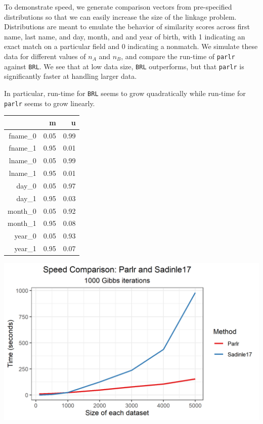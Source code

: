 \documentclass[
  12pt,
]{article}
\begin{document}
To demonstrate speed, we generate comparison vectors from pre-specified
distributions so that we can easily increase the size of the linkage
problem. Distributions are meant to emulate the behavior of similarity
scores across first name, last name, and day, month, and and year of
birth, with 1 indicating an exact match on a particular field and 0
indicating a nonmatch. We simulate these data for different values of
\(n_A\) and \(n_B\), and compare the run-time of \texttt{parlr} against
\texttt{BRL}. We see that at low data size, \texttt{BRL} outperforms,
but that \texttt{parlr} is significantly faster at handling larger data.

In particular, run-time for \texttt{BRL} seems to grow quadratically
while run-time for \texttt{parlr} seems to grow linearly.

\begin{table}[ht]
\centering
\begin{tabular}{rrr}
  \hline
 & m & u \\ 
  \hline
fname\_0 & 0.05 & 0.99 \\ 
  fname\_1 & 0.95 & 0.01 \\ 
  lname\_0 & 0.05 & 0.99 \\ 
  lname\_1 & 0.95 & 0.01 \\ 
  day\_0 & 0.05 & 0.97 \\ 
  day\_1 & 0.95 & 0.03 \\ 
  month\_0 & 0.05 & 0.92 \\ 
  month\_1 & 0.95 & 0.08 \\ 
  year\_0 & 0.05 & 0.93 \\ 
  year\_1 & 0.95 & 0.07 \\ 
   \hline
\end{tabular}
\end{table}

\begin{center}\includegraphics[width=23.6in]{../notes/figures/sadinle_speed_plot} \end{center}
\end{document}
